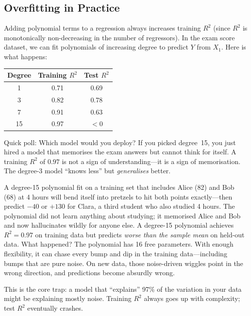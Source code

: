 \documentclass[11pt,a4paper]{article}
\theoremstyle{definition}
\theoremstyle{plain}
\theoremstyle{remark}
\begin{document}
\subsection{Overfitting in Practice}

Adding polynomial terms to a regression always increases training $R^2$ (since $R^2$ is monotonically non-decreasing in the number of regressors). In the exam score dataset, we can fit polynomials of increasing degree to predict $Y$ from $X_1$. Here is what happens:

\begin{center}
\begin{tabular}{@{}ccc@{}}
\toprule
\textbf{Degree} & \textbf{Training $R^2$} & \textbf{Test $R^2$} \\
\midrule
1 & 0.71 & 0.69 \\
3 & 0.82 & 0.78 \\
7 & 0.91 & 0.63 \\
15 & 0.97 & $<0$ \\
\bottomrule
\end{tabular}
\end{center}

\begin{warningbox}[title={The Polynomial Beauty Contest}]
Quick poll: Which model would you deploy? If you picked degree~15, you just hired a model that memorises the exam answers but cannot think for itself. A training $R^2$ of $0.97$ is not a sign of understanding---it is a sign of memorisation. The degree-3 model ``knows less'' but \emph{generalises} better.
\end{warningbox}

A degree-15 polynomial fit on a training set that includes Alice (82) and Bob (68) at 4 hours will bend itself into pretzels to hit both points exactly---then predict $-40$ or $+130$ for Clara, a third student who also studied 4 hours. The polynomial did not learn anything about studying; it memorised Alice and Bob and now hallucinates wildly for anyone else. A degree-15 polynomial achieves $R^2 = 0.97$ on training data but predicts \emph{worse than the sample mean} on held-out data. What happened? The polynomial has 16 free parameters. With enough flexibility, it can chase every bump and dip in the training data---including bumps that are pure noise. On new data, those noise-driven wiggles point in the wrong direction, and predictions become absurdly wrong.

This is the core trap: a model that ``explains'' 97\% of the variation in your data might be explaining mostly noise. Training $R^2$ always goes up with complexity; test $R^2$ eventually crashes.
\end{document}
